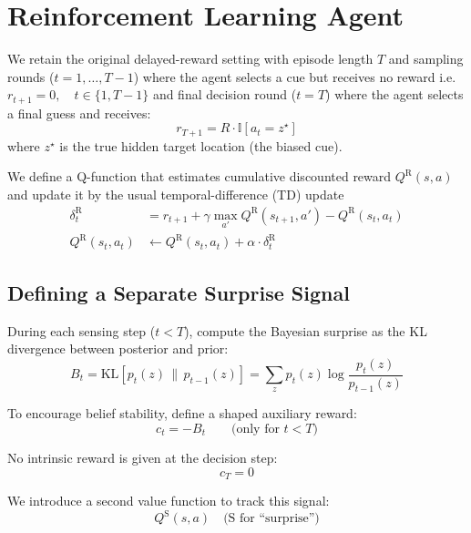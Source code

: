 \documentclass{article}
\begin{document}
\section{Reinforcement Learning Agent}

We retain the original delayed-reward setting with episode length $T$ and 
sampling rounds ($t=1,\ldots,T-1$) where the agent selects a cue but receives no reward i.e. $r_{t+1} = 0, \quad t \in  \{1, T-1\}$ and final decision round ($t=T$) where the agent selects a final guess and receives:
\begin{equation}
r_{T+1} = R \cdot \mathbb{I}[a_t = z^\star]
\end{equation}
where $z^\star$ is the true hidden target location (the biased cue).

We define a Q-function that estimates cumulative discounted reward $Q^{\mathrm{R}}(s, a)$ and update it by the usual temporal-difference (TD) update
\begin{align}
\delta_t^{\mathrm{R}} &= r_{t+1} + \gamma \max_{a'} Q^{\mathrm{R}}(s_{t+1}, a') - Q^{\mathrm{R}}(s_t, a_t) \\
Q^{\mathrm{R}}(s_t, a_t) &\leftarrow Q^{\mathrm{R}}(s_t, a_t) + \alpha \cdot \delta_t^{\mathrm{R}}
\end{align}



\subsection{Defining a Separate Surprise Signal}

During each sensing step ($t < T$), compute the Bayesian surprise as the KL divergence between posterior and prior:
\begin{equation}
B_t = \mathrm{KL}\left[p_t(z) \,\|\, p_{t-1}(z)\right] = \sum_z p_t(z) \log \frac{p_t(z)}{p_{t-1}(z)}
\end{equation}

To encourage belief stability, define a shaped auxiliary reward:
\begin{equation}
c_t = -B_t \qquad \text{(only for } t < T \text{)}
\end{equation}

No intrinsic reward is given at the decision step:
\begin{equation}
c_T = 0
\end{equation}

We introduce a second value function to track this signal:
\begin{equation}
Q^{\mathrm{S}}(s, a) \quad \text{(S for ``surprise'')}
\end{equation}
\end{document}

